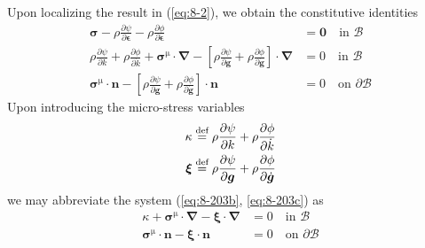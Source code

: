 Upon localizing the result in (\ref{eq:8-2}), we obtain the constitutive identities
\begin{subequations}\label{eq:8-203}
    \begin{align}
    \bm{\sigma} - \rho \frac{\partial \psi}{\partial \bm{\epsilon}} -  \rho \frac{\partial \phi}{\partial \dot{\bm{\epsilon}}} &= \bm{0} \quad
    \mbox{in } \mathcal{B}
\label{eq:8-203a}\\
    \rho\frac{\partial \psi}{\partial k} + \rho\frac{\partial \phi}{\partial \dot{k}} +
    \bm{\sigma}^{\mathrm{\mu}}\cdot \bm{\nabla} - \left[\rho\frac{\partial \psi}{\partial \bm{g}} + \rho\frac{\partial \phi}{\partial \dot{\bm{g}}}\right] \cdot \bm{\nabla} &= 0 \quad
    \mbox{in }  \mathcal{B}
\label{eq:8-203b} \\
    \bm{\sigma}^{\mathrm{\mu}}\cdot \bm{n} - \left[\rho\frac{\partial \psi}{\partial \bm{g}} + \rho\frac{\partial \phi}{\partial \dot{\bm{g}}}\right] \cdot \bm{n} &= 0 \quad
    \mbox{on }  \partial\mathcal{B}
\label{eq:8-203c}
    \end{align}
\end{subequations}
Upon introducing the micro-stress variables
\begin{subequations}\label{eq:8-105}
    \begin{align}
    \kappa &\stackrel{\text{def}}{=} \rho\frac{\partial \psi}{\partial k} + \rho\frac{\partial \phi}{\partial \dot{k}}
\label{eq:8-105a}\\
    \bm{\xi} &\stackrel{\text{def}}{=} \rho\frac{\partial \psi}{\partial \bm{g}} + \rho\frac{\partial \phi}{\partial \dot{\bm{g}}}
\label{eq:8-105b}
    \end{align}
\end{subequations}
we may abbreviate the system (\ref{eq:8-203b}, \ref{eq:8-203c}) as
\begin{subequations}\label{eq:8-206}
    \begin{align}
    \kappa + \bm{\sigma}^{\mathrm{\mu}}\cdot\bm{\nabla} - \bm{\xi}\cdot\bm{\nabla} &= 0 \quad
    \mbox{in }  \mathcal{B}
\label{eq:8-206a} \\
    \bm{\sigma}^{\mathrm{\mu}}\cdot\bm{n} -  \bm{\xi}\cdot\bm{n} &= 0 \quad
    \mbox{on }  \partial\mathcal{B}
\label{eq:8-206b}
    \end{align}
\end{subequations}
